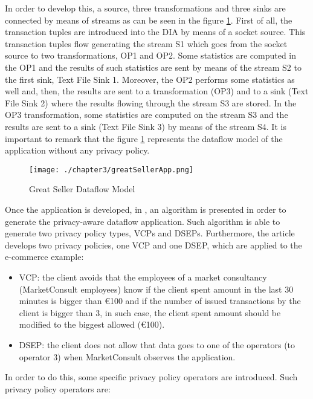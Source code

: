 In order to develop this, a source, three transformations and three sinks are connected by means of streams as can be seen in the figure \ref{fig:Great Seller Dataflow Model}. First of all, the transaction tuples are introduced into the DIA by means of a socket source. This transaction tuples flow generating the stream S1 which goes from the socket source to two transformations, OP1 and OP2. Some statistics are computed in the OP1 and the results of such statistics are sent by means of the stream S2 to the first sink, Text File Sink 1. Moreover, the OP2 performs some statistics as well and, then, the results are sent to a transformation (OP3) and to a sink (Text File Sink 2) where the results flowing through the stream S3 are stored. In the OP3 transformation, some statistics are computed on the stream S3 and the results are sent to a sink (Text File Sink 3) by means of the stream S4. It is important to remark that the figure \ref{fig:Great Seller Dataflow Model} represents the dataflow model of the application without any privacy policy.

\begin{figure}
\centering
{\texttt{[image: ./chapter3/greatSellerApp.png]}}
\caption{Great Seller Dataflow Model}
\label{fig:Great Seller Dataflow Model}
\end{figure}

Once the application is developed, in \cite{privacypoliciesarticle}, an algorithm is presented in order to generate the privacy-aware dataflow application. Such algorithm is able to generate two privacy policy types, VCPs and DSEPs. Furthermore, the article develops two privacy policies, one VCP and one DSEP, which are applied to the e-commerce example:

\begin{itemize}
\item VCP: the client avoids that the employees of a market consultancy (MarketConsult employees) know if the client spent amount in the last 30 minutes is bigger than \euro{100} and if the number of issued transactions by the client is bigger than 3, in such case, the client spent amount should be modified to the biggest allowed (\euro{100}).
\item DSEP: the client does not allow that data goes to one of the operators (to operator 3) when MarketConsult observes the application.
\end{itemize}

In order to do this, some specific privacy policy operators are introduced. Such privacy policy operators are:

